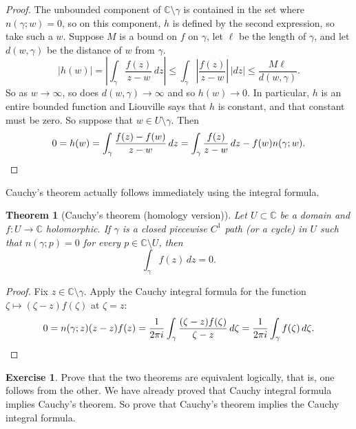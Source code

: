 \documentclass[12pt,openany]{book}
\newcommand{\sabs}[1]{\lvert {#1} \rvert}
\newcommand{\abs}[1]{\left\lvert {#1} \right\rvert}
\newcommand{\C}{{\mathbb{C}}}
\theoremstyle{plain}
\newtheorem{thm}{Theorem}[section]
\theoremstyle{remark}
\theoremstyle{definition}
\newenvironment{exbox}{%
    \def\FrameCommand{\vrule width 1pt \relax\hspace {10pt}}%
    \MakeFramed {\advance \hsize -\width \FrameRestore }%
}{%
    \endMakeFramed
}
\theoremstyle{exercise}
\newtheorem{exercise}{Exercise}[section]
\theoremstyle{example}
\begin{document}
\begin{proof}
The unbounded component of $\C \setminus \gamma$ is contained in the
set where $n(\gamma;w) = 0$, so on this component, $h$ is defined by the
second expression, so take such a $w$.
Suppose $M$ is a bound on $f$ on $\gamma$, let $\ell$ be the length of
$\gamma$, and let $d(w,\gamma)$ be the distance of $w$ from $\gamma$.
\begin{equation*}
\sabs{h(w)}
=
\abs{
\int_\gamma \frac{f(z)}{z-w} \, dz
}
\leq
\int_\gamma \abs{\frac{f(z)}{z-w}} \, \sabs{dz}
\leq
\frac{M \ell}{d(w,\gamma)} .
\end{equation*}
So as $w \to \infty$, so does $d(w,\gamma) \to \infty$ and so $h(w) \to 0$.
In particular, $h$ is an entire bounded function and
Liouville says that $h$ is constant, and that constant must be zero.
So suppose that $w \in U \setminus \gamma$.  Then
\begin{equation*}
0 = h(w) =
\int_\gamma \frac{f(z)-f(w)}{z-w} \, dz
=
\int_\gamma \frac{f(z)}{z-w} \, dz
-
f(w) n(\gamma;w) . \qedhere
\end{equation*}
\end{proof}

Cauchy's theorem actually follows immediately using the integral formula.

\begin{thm}[Cauchy's theorem (homology version)]
%
\label{thm:CThomology}%
Let $U \subset \C$ be a domain and $f \colon U \to \C$ holomorphic.  If
$\gamma$ is a
closed
piecewise $C^1$ path (or a cycle) in $U$ such that $n(\gamma;p) = 0$ for
every $p \in \C \setminus U$, then
\begin{equation*}
\int_\gamma f(z) \, dz = 0 .
\end{equation*}
\end{thm}

\begin{proof}
Fix $z \in \C \setminus \gamma$.  Apply 
the Cauchy integral formula for the function $\zeta \mapsto
(\zeta-z)f(\zeta)$ at $\zeta=z$:
\begin{equation*}
0 = n(\gamma;z) (z-z)f(z) =
\frac{1}{2\pi i} \int_\gamma \frac{(\zeta-z)f(\zeta)}{\zeta-z} \, d\zeta
=
\frac{1}{2\pi i} \int_\gamma f(\zeta) \, d\zeta . \qedhere
\end{equation*}
\end{proof}

\begin{exbox}
\begin{exercise}
Prove that the two theorems are equivalent logically, that is, one follows
from the other.  We have already proved that Cauchy integral formula
implies Cauchy's theorem.  So prove that
Cauchy's theorem implies the Cauchy integral formula.
\end{exercise}
\end{exbox}
\end{document}
